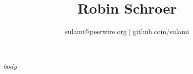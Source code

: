 \documentclass[a4paper,11pt]{article}
\title{\bfseries Robin Schroer}
\author{sulami@peerwire.org | github.com/sulami}
\date{}
\begin{document}
\maketitle

$body$
\end{document}
